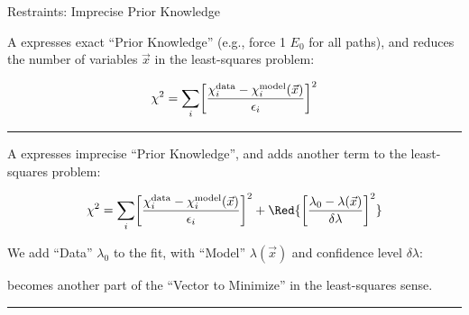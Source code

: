 
\begin{slide}{Restraints: Imprecise Prior Knowledge}
    
    A {} expresses exact ``Prior Knowledge'' (e.g.,
    force 1 $E_0$ for all paths), and reduces the number of variables 
    $\vec{x}$ in the least-squares problem:

    \pause

    \[ 
    \chi^2  =  \sum_{i}
    \biggl[ { {  \chi_{i}^{\rm data} - \chi_{i}^{\rm model}(\vec{x})
      }\over{\epsilon_i}} 
    \biggr]^2  
    \]

    \hrule \vmm
    
    A {} expresses imprecise ``Prior Knowledge'', and
    adds another term to the least-squares problem:
   
    \[ 
    \chi^2  =  \sum_{i}
    \biggl[ { {  \chi_{i}^{\rm data} - \chi_{i}^{\rm model}(\vec{x})
      }\over{\epsilon_i}} 
    \biggr]^2  
    + 
    {\Red{
     \biggl[\frac{\lambda_0 - \lambda(\vec{x})}{\delta\lambda}\biggr]^2
      }}
    \]
    
    \vmm
    
    We add ``Data'' $\lambda_0$ to the fit, with ``Model''
    $\lambda(\vec{x})$ and confidence level $\delta\lambda$:
    
    \vmm

    {\hspace{25mm}}  {\hspace{5mm}} 

    \vmm
    becomes another part of the ``Vector to Minimize'' in the least-squares
    sense.
    
    
    \vmm \hrule  \vmm 

    \begin{center}
    \end{center}


    \vmm
\vfill
\end{slide} 



